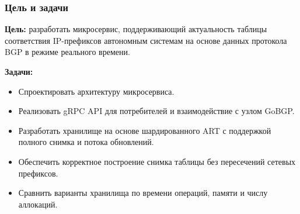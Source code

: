 \begin{frame}\frametitle{Цель и задачи}
\textbf{Цель:} разработать микросервис, поддерживающий актуальность таблицы
соответствия IP-префиксов автономным системам на основе 
данных протокола BGP в режиме реального времени.

\vspace{0.7em}
\textbf{Задачи:}
\begin{itemize}\setlength{\itemsep}{0.25em}
  \item Спроектировать архитектуру микросервиса.
  \item Реализовать gRPC API для потребителей и
  взаимодействие с узлом GoBGP.
  \item Разработать хранилище на основе
  шардированного ART с поддержкой полного
  снимка и потока обновлений.
  \item Обеспечить корректное построение снимка
  таблицы без пересечений сетевых префиксов.
  \item Сравнить варианты хранилища по времени операций,
  памяти и числу аллокаций.
\end{itemize}
\end{frame}
